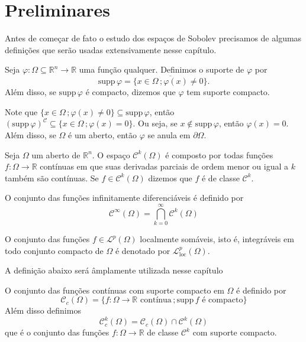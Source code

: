 \documentclass[a4paper, 11pt]{book}
\theoremstyle{definition}
\newcommand{\bR}{\mathbb{R}}
\newcommand{\cC}{\mathcal{C}}
\newcommand{\cL}{\mathcal{L}}
\newcommand{\supp}{\mathrm{supp}\,}
\begin{document}
\section{Preliminares}

Antes de começar de fato o estudo dos espaços de Sobolev precisamos de algumas definições que serão usadas extensivamente nesse capítulo.

\begin{dbox} \label{def:suporte}
    Seja $\varphi : \Omega \subseteq \bR ^n \to \bR$ uma função qualquer. Definimos o suporte de $\varphi$ por
    \[
        \supp \varphi = \overline{\{x \in \Omega \,; \varphi(x) \neq 0\}}.
    \]
    Além disso, se $\supp\varphi$ é compacto, dizemos que $\varphi$ tem suporte compacto.
\end{dbox}

Note que $\{x \in \Omega \,; \varphi(x) \neq 0\} \subseteq \supp \varphi$, então $(\supp \varphi)^\cC \subseteq \{x \in \Omega \,; \varphi(x) = 0\}$. Ou seja, se $x \not\in \supp \varphi$, então $\varphi(x) = 0$.
Além disso, se $\Omega$ é um aberto, então $\varphi$ se anula em $\partial\Omega$.

\begin{dbox}
    Seja $\Omega$ um aberto de $\bR^n$. O espaço $\cC^k(\Omega)$ é composto por todas funções $f : \Omega \to \bR$ contínuas em que suas derivadas parciais de ordem menor ou igual a $k$ também são contínuas.
    Se $f \in \cC^k(\Omega)$ dizemos que $f$ é de classe $\cC^k$.

    O conjunto das funções infinitamente diferenciáveis é definido por
    \[
        \cC^\infty(\Omega) = \bigcap_{k=0}^\infty \cC^k(\Omega)
    \]
\end{dbox}

\begin{dbox}
    O conjunto das funções $f \in \cL^p(\Omega)$ localmente somáveis, isto é, integráveis em todo conjunto compacto de $\Omega$ é denotado por $\cL^p_{\mathrm{loc}}(\Omega)$.
\end{dbox}

A definição abaixo será âmplamente utilizada nesse capítulo

\begin{dbox}
    O conjunto das funções contínuas com suporte compacto em $\Omega$ é definido por
    \[
        \cC_c(\Omega) = \{f : \Omega \to \bR \text{ contínua} \,; \supp f \text{ é compacto}\}
    \]
    Além disso definimos
    \[
        \cC^k_c(\Omega) = \cC_c(\Omega) \cap \cC^k(\Omega)
    \]
    que é o conjunto das funções $f : \Omega \to \bR$ de classe $\cC^k$ com suporte compacto.
\end{dbox}
\end{document}
